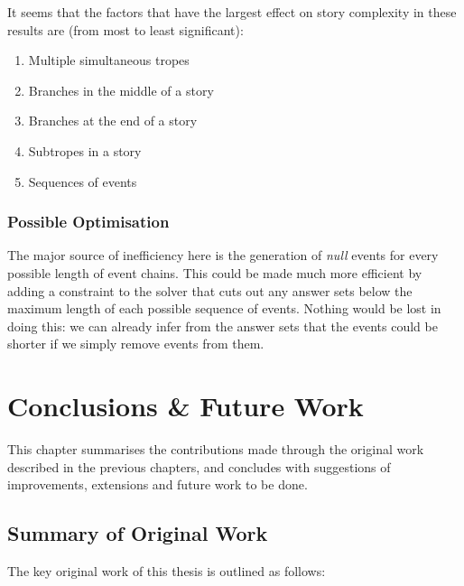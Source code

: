 \documentclass[11pt]{report}
\begin{document}
It seems that the factors that have the largest effect on story complexity in
these results are (from most to least significant):

\begin{enumerate}
  \item Multiple simultaneous tropes
  \item Branches in the middle of a story
  \item Branches at the end of a story
  \item Subtropes in a story
  \item Sequences of events
\end{enumerate}

\subsection{Possible Optimisation}
The major source of inefficiency here is the generation of \emph{null} events
for every possible length of event chains. This could be made much more efficient by
adding a constraint to the solver that cuts out any answer sets below the
maximum length of each possible sequence of events. Nothing would be lost in
doing this: we can already infer from the answer sets that the events could be
shorter if we simply remove events from them.

\chapter{Conclusions \& Future Work}
\label{cha:conclusions}

This chapter summarises the contributions made through the original work described
in the previous chapters, and concludes with suggestions of improvements,
extensions and future work to be done.

\section{Summary of Original Work}

The key original work of this thesis is outlined as follows:
\end{document}
